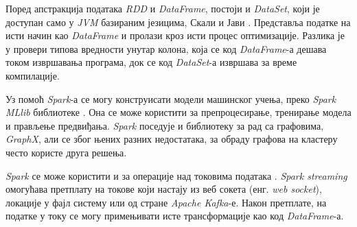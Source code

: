 \documentclass[12pt,oneside]{memoir}
\begin{document}
Поред апстракција података \textit{RDD} и \textit{DataFrame}, постоји и \textit{DataSet}, који је доступан само у \textit{JVM} базираним језицима, Скали и Јави \cite{spark_guide}. Представља податке на исти начин као \textit{DataFrame} и пролази кроз исти процес оптимизације. Разлика је у провери типова вредности унутар колона, која се код \textit{DataFrame}-а дешава током извршавања програма, док се код \textit{DataSet}-а извршава за време компилације.

Уз помоћ \textit{Spark}-а се могу конструисати модели машинског учења, преко \textit{Spark MLlib} библиотеке \cite{spark_guide}. Она се може користити за препроцесирање, тренирање модела и прављење предвиђања. \textit{Spark} поседује и библиотеку за рад са графовима, \textit{GraphX}, али се због њених разних недостатака, за обраду графова на кластеру често користе друга решења.

\textit{Spark} се може користити и за операције над токовима података \cite{spark_streaming}. \textit{Spark streaming} омогућава претплату на токове који настају из веб сокета (енг. \textit{web socket}), локације у фајл систему или од стране \textit{Apache Kafka}-е. Након претплате, на податке у току се могу примењивати исте трансформације као код \textit{DataFrame}-а.

\end{document}
